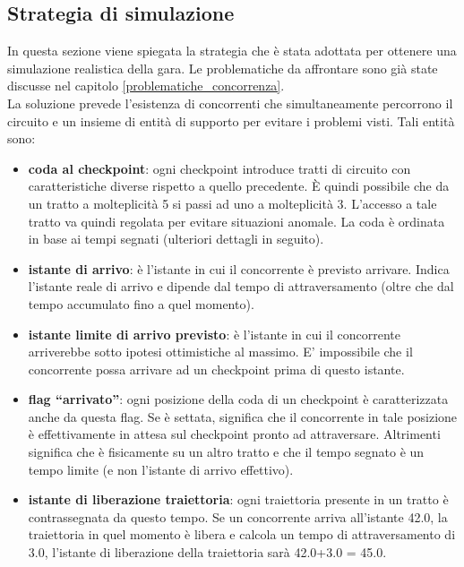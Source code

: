 \subsection{Strategia di simulazione}
\label{strategia_simulazione}
In questa sezione viene spiegata la strategia che \`{e} stata adottata per ottenere una simulazione realistica della gara. Le problematiche da 
affrontare sono gi\`{a} state discusse nel capitolo \ref{problematiche_concorrenza}.\\ 
La soluzione prevede l'esistenza di concorrenti che simultaneamente percorrono il circuito e un insieme di entit\`{a} di supporto per evitare 
i problemi visti. Tali entit\`{a} sono:
\begin{itemize}
  \item \textbf{coda al checkpoint}: ogni checkpoint introduce tratti di circuito con caratteristiche diverse rispetto a quello precedente.
	      \`{E} quindi possibile che da un tratto a molteplicit\`{a} 5 si passi ad uno a molteplicit\`{a} 3. L'accesso a tale tratto va quindi
	      regolata per evitare situazioni anomale. La coda \`{e} ordinata in base ai tempi segnati (ulteriori dettagli in seguito).
  \item \textbf{istante di arrivo}: \`{e} l'istante in cui il concorrente \`{e} previsto arrivare. Indica l'istante reale di arrivo e dipende
	      dal tempo di attraversamento (oltre che dal tempo accumulato fino a quel momento).
  \item \textbf{istante limite di arrivo previsto}: \`{e} l'istante in cui il concorrente arriverebbe sotto ipotesi ottimistiche al massimo. 
	      E' impossibile che il concorrente possa arrivare ad un checkpoint prima di questo istante. 
  \item \textbf{flag ``arrivato''}: ogni posizione della coda di un checkpoint \`{e} caratterizzata anche da questa flag. Se \`{e} settata, significa
	      che il concorrente in tale posizione \`{e} effettivamente in attesa sul checkpoint pronto ad attraversare. Altrimenti significa
	      che \`{e} fisicamente su un altro tratto e che il tempo segnato \`{e} un tempo limite (e non l'istante di arrivo effettivo).
  \item \textbf{istante di liberazione traiettoria}: ogni traiettoria presente in un tratto \`{e} contrassegnata da questo tempo. Se un concorrente
	      arriva all'istante 42.0, la traiettoria in quel momento \`{e} libera e calcola un tempo di attraversamento di 3.0, l'istante di liberazione
	      della traiettoria sar\`{a} 42.0+3.0 = 45.0. 
\end{itemize}

